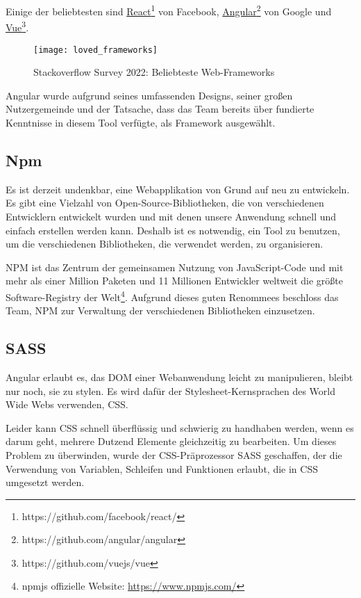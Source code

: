 Einige der beliebtesten sind \href{https://github.com/facebook/react/}{React}\footnote{https://github.com/facebook/react/} von Facebook,
\href{https://github.com/facebook/react/}{Angular}\footnote{https://github.com/angular/angular} von Google und
\href{https://github.com/facebook/react/}{Vue}\footnote{https://github.com/vuejs/vue}.

\begin{figure}[h]
  \centering
  \texttt{[image: loved\_frameworks]}
  \caption{Stackoverflow Survey 2022: Beliebteste Web-Frameworks}
\end{figure}

Angular wurde aufgrund seines umfassenden Designs, seiner großen Nutzergemeinde und der Tatsache, dass das Team bereits über fundierte Kenntnisse in diesem Tool verfügte, als Framework ausgewählt.

\subsection{Npm}
Es ist derzeit undenkbar, eine Webapplikation von Grund auf neu zu entwickeln.
Es gibt eine Vielzahl von Open-Source-Bibliotheken, die von verschiedenen Entwicklern entwickelt wurden und mit denen unsere Anwendung schnell und einfach erstellen werden kann.
Deshalb ist es notwendig, ein Tool zu benutzen, um die verschiedenen Bibliotheken, die verwendet werden, zu organisieren.

\ac{NPM} ist das Zentrum der gemeinsamen Nutzung von JavaScript-Code und mit mehr als einer Million Paketen und 11 Millionen Entwickler weltweit die größte Software-Registry der Welt\footnote{npmjs offizielle Website: \href{https://www.npmjs.com/}{https://www.npmjs.com/}}.
Aufgrund dieses guten Renommees beschloss das Team, NPM zur Verwaltung der verschiedenen Bibliotheken einzusetzen.

\subsection{SASS}
Angular erlaubt es, das DOM einer Webanwendung leicht zu manipulieren, bleibt nur noch, sie zu stylen.
Es wird dafür der Stylesheet-Kernsprachen des World Wide Webs verwenden, \ac{CSS}.

Leider kann CSS schnell überflüssig und schwierig zu handhaben werden, wenn es darum geht, mehrere Dutzend Elemente gleichzeitig zu bearbeiten.
Um dieses Problem zu überwinden, wurde der CSS-Präprozessor \ac{SASS} geschaffen, der die Verwendung von Variablen, Schleifen und Funktionen erlaubt, die in CSS umgesetzt werden.

